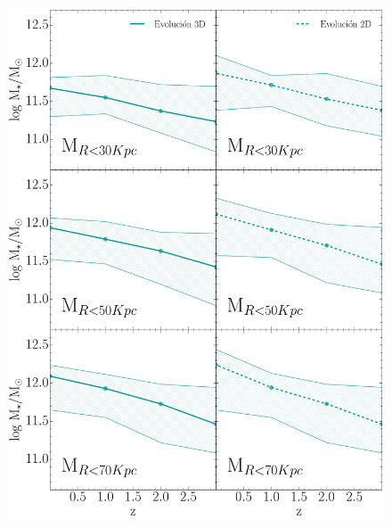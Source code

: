 \begin{figure}[H]
 \centering
 \includegraphics[height=18cm, width=14cm]{../al_final/LR/evolucion/simulacion/evolucion.pdf}
\end{figure}




